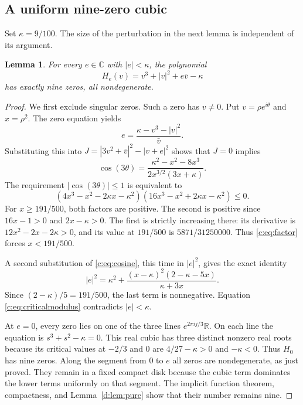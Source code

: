 \documentclass[UTF8,11pt]{ctexart}
\newtheorem{lem}[thm]{Lemma}
\theoremstyle{definition}
\numberwithin{equation}{section}
\newcommand{\C}{\mathbb C}\newcommand{\R}{\mathbb R}
\begin{document}
\subsection{A uniform nine-zero cubic}\label{c:sec:model}

Set $\kappa=9/100$. The size of the perturbation in the next lemma is
independent of its argument.
\begin{lem}\label{c:lem:cubic}
For every $e\in\C$ with $|e|<\kappa$, the polynomial
\[
 H_e(v)=v^3+|v|^2+e\bar v-\kappa
\]
has exactly nine zeros, all nondegenerate.
\end{lem}
\begin{proof}
We first exclude singular zeros. Such a zero has $v\ne0$. Put
$v=\rho e^{i\theta}$ and $x=\rho^2$. The zero equation yields
\[
 e=\frac{\kappa-v^3-|v|^2}{\bar v}.
\]
Substituting this into
$J=|3v^2+\bar v|^2-|v+e|^2$ shows that $J=0$ implies
\begin{equation}\label{c:eq:cosine}
 \cos(3\theta)=
 \frac{\kappa^2-x^2-8x^3}{2x^{3/2}(3x+\kappa)}.
\end{equation}
The requirement $|\cos(3\theta)|\le1$ is equivalent to
\begin{equation}\label{c:eq:factor}
 (4x^3-x^2-2\kappa x-\kappa^2)
 (16x^3-x^2+2\kappa x-\kappa^2)\le0.
\end{equation}
For $x\ge191/500$, both factors are positive. The second is positive
since $16x-1>0$ and $2x-\kappa>0$. The first is strictly increasing
there: its derivative is $12x^2-2x-2\kappa>0$, and its value at
$191/500$ is $5871/31250000$. Thus \eqref{c:eq:factor} forces
$x<191/500$.

A second substitution of \eqref{c:eq:cosine}, this time in $|e|^2$, gives
the exact identity
\begin{equation}\label{c:eq:criticalmodulus}
 |e|^2=\kappa^2+
 \frac{(x-\kappa)^2(2-\kappa-5x)}{\kappa+3x}.
\end{equation}
Since $(2-\kappa)/5=191/500$, the last term is nonnegative. Equation
\eqref{c:eq:criticalmodulus} contradicts $|e|<\kappa$.

At $e=0$, every zero lies on one of the three lines
$e^{2\pi i j/3}\R$. On each line the equation is
$s^3+s^2-\kappa=0$. This real cubic has three distinct nonzero real
roots because its critical values at $-2/3$ and $0$ are
$4/27-\kappa>0$ and $-\kappa<0$. Thus $H_0$ has nine zeros.
Along the segment from $0$ to $e$ all zeros are nondegenerate, as just
proved. They remain in a fixed compact disk because the cubic term
dominates the lower terms uniformly on that segment. The implicit
function theorem, compactness, and Lemma~\ref{d:lem:pure} show that their
number remains nine.
\end{proof}
\end{document}
